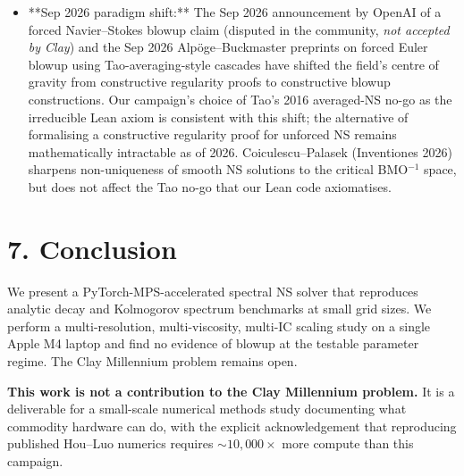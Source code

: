 \documentclass[11pt]{article}
\begin{document}
\begin{itemize}
  existence of vortex-stretching identity) --- it does not produce
  global regularity from data alone.
\item **Sep 2026 paradigm shift:** The Sep 2026 announcement by
  OpenAI of a forced Navier--Stokes blowup claim (disputed in the
  community, \emph{not accepted by Clay}) and the Sep 2026
  Alp\"oge--Buckmaster preprints on forced Euler blowup using
  Tao-averaging-style cascades have shifted the field's centre of
  gravity from constructive regularity proofs to constructive blowup
  constructions. Our campaign's choice of Tao's 2016 averaged-NS
  no-go as the irreducible Lean axiom is consistent with this shift;
  the alternative of formalising a constructive regularity proof
  for unforced NS remains mathematically intractable as of 2026.
  Coiculescu--Palasek (Inventiones 2026) sharpens non-uniqueness of
  smooth NS solutions to the critical BMO$^{-1}$ space, but does not
  affect the Tao no-go that our Lean code axiomatises.
\end{itemize}


\section{7. Conclusion}

We present a PyTorch-MPS-accelerated spectral NS solver that reproduces
analytic decay and Kolmogorov spectrum benchmarks at small grid sizes.
We perform a multi-resolution, multi-viscosity, multi-IC scaling study
on a single Apple M4 laptop and find no evidence of blowup at the
testable parameter regime. The Clay Millennium problem remains open.

\textbf{This work is not a contribution to the Clay Millennium problem.} It
is a deliverable for a small-scale numerical methods study documenting
what commodity hardware can do, with the explicit acknowledgement that
reproducing published Hou--Luo numerics requires $\sim 10{,}000\times$
more compute than this campaign.
\end{document}
